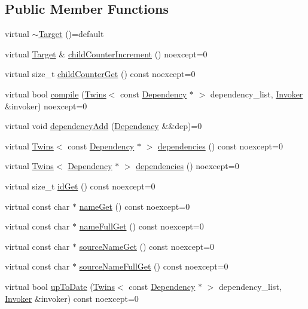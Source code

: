 \subsection*{Public Member Functions}
\begin{DoxyCompactItemize}
\item 
virtual \hyperlink{class_maike_1_1_target_aa2d6b53a7655c6daef570062a63bcabf}{$\sim$\+Target} ()=default
\item 
virtual \hyperlink{class_maike_1_1_target}{Target} \& \hyperlink{class_maike_1_1_target_a36c0f490a869e438b8a24c55d544aac2}{child\+Counter\+Increment} () noexcept=0
\item 
virtual size\+\_\+t \hyperlink{class_maike_1_1_target_a9ab02f5632d53552e6b6fc554151b0fb}{child\+Counter\+Get} () const noexcept=0
\item 
virtual bool \hyperlink{class_maike_1_1_target_a6f8fb0e12684b7c699e4cd1f16a5c35f}{compile} (\hyperlink{struct_maike_1_1_twins}{Twins}$<$ const \hyperlink{class_maike_1_1_dependency}{Dependency} $\ast$ $>$ dependency\+\_\+list, \hyperlink{class_maike_1_1_invoker}{Invoker} \&invoker) noexcept=0
\item 
virtual void \hyperlink{class_maike_1_1_target_a901b82d44e48d2050bc9107f3bc31348}{dependency\+Add} (\hyperlink{class_maike_1_1_dependency}{Dependency} \&\&dep)=0
\item 
virtual \hyperlink{struct_maike_1_1_twins}{Twins}$<$ const \hyperlink{class_maike_1_1_dependency}{Dependency} $\ast$ $>$ \hyperlink{class_maike_1_1_target_aca2d8c784e9f1ee8527b361dda109a20}{dependencies} () const noexcept=0
\item 
virtual \hyperlink{struct_maike_1_1_twins}{Twins}$<$ \hyperlink{class_maike_1_1_dependency}{Dependency} $\ast$ $>$ \hyperlink{class_maike_1_1_target_a5e22273131ace8711219f2edf7e69a72}{dependencies} () noexcept=0
\item 
virtual size\+\_\+t \hyperlink{class_maike_1_1_target_a8a8ee23dcb3c1ec7a674d8eed67233d5}{id\+Get} () const noexcept=0
\item 
virtual const char $\ast$ \hyperlink{class_maike_1_1_target_ad68cea274bfcaef5cc99b7671f92be17}{name\+Get} () const noexcept=0
\item 
virtual const char $\ast$ \hyperlink{class_maike_1_1_target_a38c1d42dd42ae141310df41ebd5b71fc}{name\+Full\+Get} () const noexcept=0
\item 
virtual const char $\ast$ \hyperlink{class_maike_1_1_target_a92a08944fb8ab1fe745cb4bdf1f15acb}{source\+Name\+Get} () const noexcept=0
\item 
virtual const char $\ast$ \hyperlink{class_maike_1_1_target_a1a851256ee2e022b1491c2c91e88a4ad}{source\+Name\+Full\+Get} () const noexcept=0
\item 
virtual bool \hyperlink{class_maike_1_1_target_a893976cd47a84706bdcb3b69a9f068ad}{up\+To\+Date} (\hyperlink{struct_maike_1_1_twins}{Twins}$<$ const \hyperlink{class_maike_1_1_dependency}{Dependency} $\ast$ $>$ dependency\+\_\+list, \hyperlink{class_maike_1_1_invoker}{Invoker} \&invoker) const noexcept=0
\end{DoxyCompactItemize}


